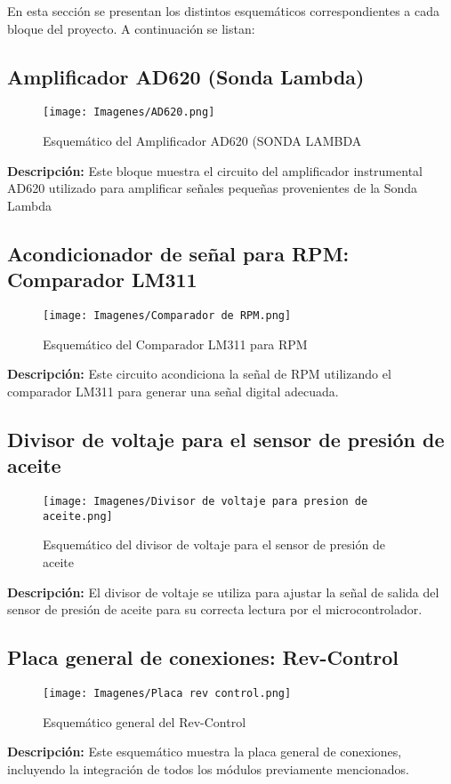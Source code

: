 En esta sección se presentan los distintos esquemáticos correspondientes a cada bloque del proyecto. A continuación se listan:

\subsection{Amplificador AD620 (Sonda Lambda)}
\begin{figure}[H]
    \centering
    \texttt{[image: Imagenes/AD620.png]}
    \caption{Esquemático del Amplificador AD620 (SONDA LAMBDA}
    \label{fig:ad620}
\end{figure}
\textbf{Descripción:} Este bloque muestra el circuito del amplificador instrumental AD620 utilizado para amplificar señales pequeñas provenientes de la Sonda Lambda

\subsection{Acondicionador de señal para RPM: Comparador LM311}
\begin{figure}[H]
    \centering
    \texttt{[image: Imagenes/Comparador de RPM.png]}
    \caption{Esquemático del Comparador LM311 para RPM}
    \label{fig:lm311}
\end{figure}
\textbf{Descripción:} Este circuito acondiciona la señal de RPM utilizando el comparador LM311 para generar una señal digital adecuada.

\subsection{Divisor de voltaje para el sensor de presión de aceite}
\begin{figure}[H]
    \centering
    \texttt{[image: Imagenes/Divisor de voltaje para presion de aceite.png]}
    \caption{Esquemático del divisor de voltaje para el sensor de presión de aceite}
    \label{fig:divisor_presion}
\end{figure}
\textbf{Descripción:} El divisor de voltaje se utiliza para ajustar la señal de salida del sensor de presión de aceite para su correcta lectura por el microcontrolador.

\subsection{Placa general de conexiones: Rev-Control}
\begin{figure}[H]
    \centering
    \texttt{[image: Imagenes/Placa rev control.png]}
    \caption{Esquemático general del Rev-Control}
    \label{fig:rev_control}
\end{figure}
\textbf{Descripción:} Este esquemático muestra la placa general de conexiones, incluyendo la integración de todos los módulos previamente mencionados.

